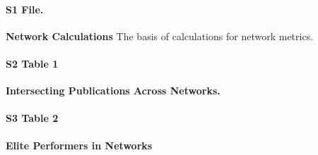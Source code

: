\documentclass[10pt,letterpaper]{article}
\begin{document}
\begin{thebibliography}{10}
\paragraph*{S1 File.}
\label{S1_File}
{\bf Network Calculations} The basis of calculations for network metrics.

\paragraph*{S2 Table 1}
\label{S2_Table 1}
{\bf Intersecting Publications Across Networks.} 

\paragraph*{S3 Table 2}
\label{S3_Table 2}
{\bf Elite Performers in Networks} 


\end{thebibliography}
\end{document}
